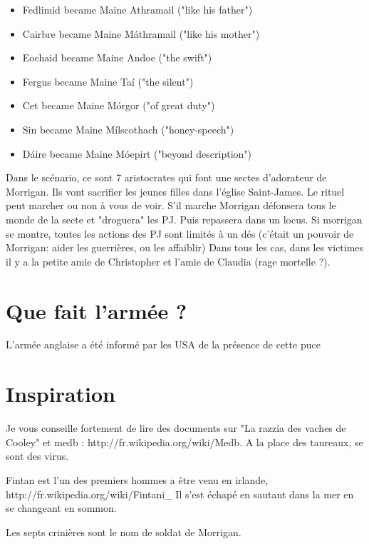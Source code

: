 \documentclass[oneside,12pt]{book}
\begin{document}
\begin{flushleft}
\begin{itemize}
\item Fedlimid became Maine Athramail ("like his father")
\item Cairbre became Maine Máthramail ("like his mother")
\item Eochaid became Maine Andoe ("the swift")
\item Fergus became Maine Taí ("the silent")
\item Cet became Maine Mórgor ("of great duty")
\item Sin became Maine Mílscothach ("honey-speech")
\item Dáire became Maine Móepirt ("beyond description")
\end{itemize}


Dans le scénario, ce sont 7 aristocrates qui font une sectes d'adorateur de Morrigan. Ils vont sacrifier les jeunes filles dans l'église Saint-James.
Le rituel peut marcher ou non à vous de voir. S'il marche Morrigan défonsera tous le monde de la secte et "droguera" les PJ. Puis repassera dans un locus. 
Si morrigan se montre, toutes les actions des PJ sont limités à un dés (c'était un pouvoir de Morrigan: aider les guerrières, ou les affaiblir)
Dans tous les cas, dans les victimes il y a la petite amie de Christopher et l'amie de Claudia (rage mortelle ?). 
 




\section{Que fait l'armée ?}
L'armée anglaise a été informé par les USA de la présence de cette puce


\section{Inspiration}
Je vous conseille fortement de lire des documents sur "La razzia des vaches de Cooley" et medb : http://fr.wikipedia.org/wiki/Medb.
A la place des taureaux, se sont des virus. 

Fintan est l'un des premiers hommes a être venu en irlande,  http://fr.wikipedia.org/wiki/Fintani\_%
Il s'est échapé en sautant dans la mer en se changeant en sommon.

Les septs crinières sont le nom de soldat de Morrigan. 

\end{flushleft}
\end{document}
